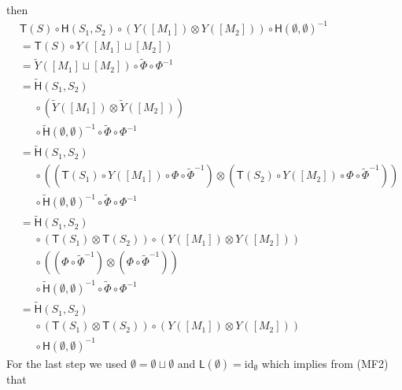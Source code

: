 then
\begin{align*}
  &
  \mathsf{T}(S)
  \circ
  \mathsf{H}(S_{1},S_{2})
  \circ
  \left(
    Y([M_{1}])
  \otimes
    Y([M_{2}])
  \right)
  \circ
  \mathsf{H}(\emptyset,\emptyset)^{-1}
  \\
  &=
  \mathsf{T}(S)
  \circ
  Y([M_{1}] \sqcup [M_{2}])
  \\
  &=
  \tilde{Y}([M_{1}] \sqcup [M_{2}])
  \circ
  \tilde{\Phi}
  \circ
  \Phi^{-1}
  \\
  &=
  \tilde{\mathsf{H}}(S_{1},S_{2})
  \\
  &\phantom{=}
  \circ
  \left(
    \tilde{Y}([M_{1}])
    \otimes
    \tilde{Y}([M_{2}])
  \right)
  \\
  &\phantom{=}
  \circ
  \tilde{\mathsf{H}}(\emptyset,\emptyset)^{-1}
  \circ
  \tilde{\Phi}
  \circ
  \Phi^{-1}
  \\
  &=
  \tilde{\mathsf{H}}(S_{1},S_{2})
  \\
  &\phantom{=}
  \circ
  \left(
    \left(
      \mathsf{T}(S_{1})
      \circ
      Y([M_{1}])
      \circ
      \Phi
      \circ
      \tilde{\Phi}^{-1}
    \right)
    \otimes
    \left(
      \mathsf{T}(S_{2})
      \circ
      Y([M_{2}])
      \circ
      \Phi
      \circ
      \tilde{\Phi}^{-1}
    \right)
  \right)
  \\
  &\phantom{=}
  \circ
  \tilde{\mathsf{H}}(\emptyset,\emptyset)^{-1}
  \circ
  \tilde{\Phi}
  \circ
  \Phi^{-1}
  \\
  &=
  \tilde{\mathsf{H}}(S_{1},S_{2})
  \\
  &\phantom{=}
  \circ
  \left(
    \mathsf{T}(S_{1})
    \otimes
    \mathsf{T}(S_{2})
  \right)
  \circ
  \left(
    Y([M_{1}])
    \otimes
    Y([M_{2}])
  \right)
  \\
  &\phantom{=}
  \circ
  \left(
    (\Phi \circ \tilde{\Phi}^{-1})
    \otimes
    (\Phi \circ \tilde{\Phi}^{-1})
  \right)
  \\
  &\phantom{=}
  \circ
  \tilde{\mathsf{H}}(\emptyset,\emptyset)^{-1}
  \circ
  \tilde{\Phi}
  \circ
  \Phi^{-1}
  \\
  &=
  \tilde{\mathsf{H}}(S_{1},S_{2})
  \\
  &\phantom{=}
  \circ
  \left(
    \mathsf{T}(S_{1})
    \otimes
    \mathsf{T}(S_{2})
  \right)
  \circ
  \left(
    Y([M_{1}])
    \otimes
    Y([M_{2}])
  \right)
  \\
  &\phantom{=}
  \circ
  \mathsf{H}(\emptyset,\emptyset)^{-1}
\end{align*}
For the last step we used $\emptyset = \emptyset \sqcup \emptyset$ and $\mathsf{L}(\emptyset) = \mathrm{id}_{\emptyset}$ which implies from (MF2) that
